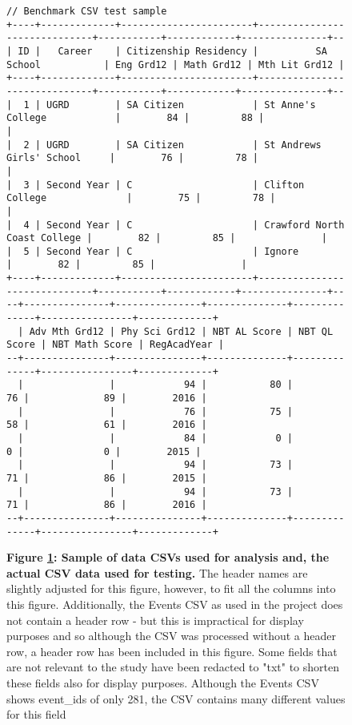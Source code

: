 \begin{figure}[H]
\begin{mdframed}[rightline=false,leftline=false]
\begin{BVerbatim}[fontsize=\tiny]
// Benchmark CSV test sample
+----+-------------+-----------------------+------------------------------+-----------+------------+---------------+--
| ID |   Career    | Citizenship Residency |          SA School           | Eng Grd12 | Math Grd12 | Mth Lit Grd12 |
+----+-------------+-----------------------+------------------------------+-----------+------------+---------------+--
|  1 | UGRD        | SA Citizen            | St Anne's College            |        84 |         88 |               |
|  2 | UGRD        | SA Citizen            | St Andrews Girls' School     |        76 |         78 |               |
|  3 | Second Year | C                     | Clifton College              |        75 |         78 |               |
|  4 | Second Year | C                     | Crawford North Coast College |        82 |         85 |               |
|  5 | Second Year | C                     | Ignore                       |        82 |         85 |               |
+----+-------------+-----------------------+------------------------------+-----------+------------+---------------+--
--+---------------+---------------+--------------+--------------+----------------+-------------+
  | Adv Mth Grd12 | Phy Sci Grd12 | NBT AL Score | NBT QL Score | NBT Math Score | RegAcadYear |
--+---------------+---------------+--------------+--------------+----------------+-------------+
  |               |            94 |           80 |           76 |             89 |        2016 |
  |               |            76 |           75 |           58 |             61 |        2016 |
  |               |            84 |            0 |            0 |              0 |        2015 |
  |               |            94 |           73 |           71 |             86 |        2015 |
  |               |            94 |           73 |           71 |             86 |        2016 |
--+---------------+---------------+--------------+--------------+----------------+-------------+

        \end{BVerbatim}
    \end{mdframed}
    \caption[CSV Samples]{\textbf{Figure \ref{fig-sample-csv-files}: Sample of data CSVs used for analysis and, the actual CSV data used for testing.} The header names are slightly adjusted for this figure, however, to fit all the columns into this figure. Additionally, the Events CSV as used in the project does not contain a header row - but this is impractical for display purposes and so although the CSV was processed without a header row, a header row has been included in this figure. Some fields that are not relevant to the study have been redacted to "txt" to shorten these fields also for display purposes. Although the Events CSV shows event\_ids of only 281, the CSV contains many different values for this field}
    \label{fig-sample-csv-files}
\end{figure}

